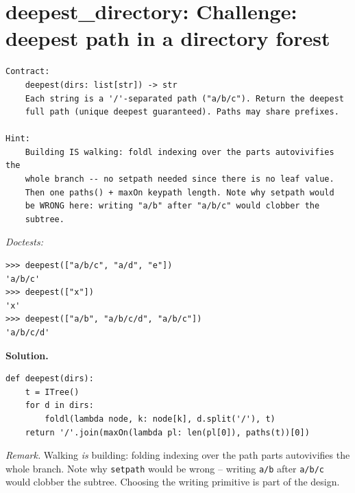 \documentclass[11pt,letterpaper]{book}
\begin{document}
\section{deepest\_directory: Challenge: deepest path in a directory forest}
\begin{lstlisting}[style=spec]
Contract:
    deepest(dirs: list[str]) -> str
    Each string is a '/'-separated path ("a/b/c"). Return the deepest
    full path (unique deepest guaranteed). Paths may share prefixes.

Hint:
    Building IS walking: foldl indexing over the parts autovivifies the
    whole branch -- no setpath needed since there is no leaf value.
    Then one paths() + maxOn keypath length. Note why setpath would
    be WRONG here: writing "a/b" after "a/b/c" would clobber the
    subtree.
\end{lstlisting}
\noindent\textit{Doctests:}
\begin{lstlisting}[style=spec]
>>> deepest(["a/b/c", "a/d", "e"])
'a/b/c'
>>> deepest(["x"])
'x'
>>> deepest(["a/b", "a/b/c/d", "a/b/c"])
'a/b/c/d'
\end{lstlisting}
\noindent\textbf{Solution.}
\begin{lstlisting}[style=code]
def deepest(dirs):
    t = ITree()
    for d in dirs:
        foldl(lambda node, k: node[k], d.split('/'), t)
    return '/'.join(maxOn(lambda pl: len(pl[0]), paths(t))[0])
\end{lstlisting}

\noindent\textit{Remark.} Walking \emph{is} building: folding indexing over the
path parts autovivifies the whole branch. Note why \texttt{setpath} would be
wrong -- writing \texttt{a/b} after \texttt{a/b/c} would clobber the subtree.
Choosing the writing primitive is part of the design.
\end{document}
